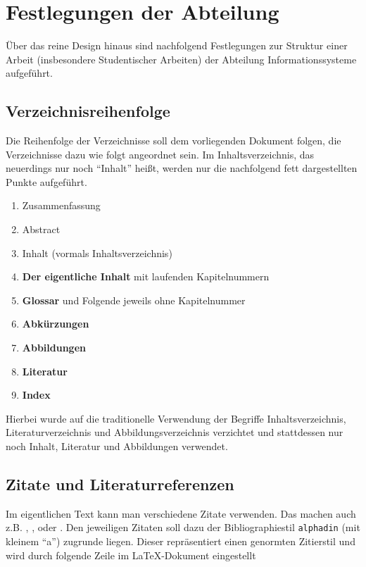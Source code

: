 \chapter{Festlegungen der Abteilung}
\"{U}ber das reine Design hinaus sind nachfolgend Festlegungen zur
Struktur einer Arbeit (insbesondere Studentischer Arbeiten) der
Abteilung Informationssysteme  aufgef\"{u}hrt.



\section{Verzeichnisreihenfolge}
Die Reihenfolge der Verzeichnisse soll dem vorliegenden Dokument
folgen, die Verzeichnisse dazu wie folgt angeordnet sein. Im
Inhaltsverzeichnis, das neuerdings nur noch "`Inhalt"' hei{\ss}t,
werden nur die nachfolgend fett dargestellten Punkte aufgef\"{u}hrt.

\begin{enumerate}
\item Zusammenfassung
\item Abstract
\item Inhalt (vormals Inhaltsverzeichnis)
\item \textbf{Der eigentliche Inhalt} mit laufenden Kapitelnummern
\item \textbf{Glossar} und Folgende jeweils ohne Kapitelnummer
\item \textbf{Abk\"{u}rzungen}
\item \textbf{Abbildungen}
\item \textbf{Literatur}
\item \textbf{Index}
\end{enumerate}


Hierbei wurde auf die traditionelle Verwendung der Begriffe
Inhaltsverzeichnis, Literaturverzeichnis und Abbildungsverzeichnis
verzichtet und stattdessen nur noch Inhalt, Literatur und
Abbildungen verwendet.


\section{Zitate und Literaturreferenzen}
Im eigentlichen Text kann man verschiedene Zitate verwenden. Das
machen auch z.B. \cite{abel03}, \cite{appelrath06}, \cite{back01}
oder \cite{bakos91}. Den jeweiligen Zitaten soll dazu der
Bibliographiestil \texttt{alphadin} (mit kleinem "`a"') zugrunde
liegen. Dieser repr\"{a}sentiert einen genormten Zitierstil und wird
durch folgende Zeile im \LaTeX-Dokument eingestellt

